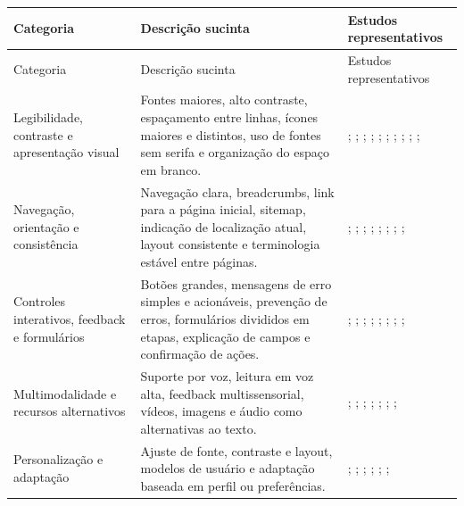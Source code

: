 \begin{longtable}{|p{3.2cm}|p{6cm}|p{5.8cm}|}
\hline
Categoria & Descrição sucinta & Estudos representativos \\ \hline
\endfirsthead
\hline
Categoria & Descrição sucinta & Estudos representativos \\ \hline
\endhead
\hline
\endfoot
\endlastfoot
Legibilidade, contraste e apresentação visual &
Fontes maiores, alto contraste, espaçamento entre linhas, ícones maiores e distintos, uso de fontes sem serifa e organização do espaço em branco. &
\cite{breaking_barriers}; \cite{ko2019old}; \cite{wang2020research}; \cite{darvishy2013inclusive}; \cite{hart2008evaluating}; \cite{sun2010preliminary}; \cite{kurniawan2005research}; \cite{lindberg2021towards}; \cite{lum2016development}; \cite{patsoule2012redesigning}; \cite{becker2004study} \\ \hline
Navegação, orientação e consistência &
Navegação clara, breadcrumbs, link para a página inicial, sitemap, indicação de localização atual, layout consistente e terminologia estável entre páginas. &
\cite{delara2016study}; \cite{finn2013usability}; \cite{dombrovskaia2021guideline}; \cite{patsoule2012redesigning}; \cite{sun2010preliminary}; \cite{kurniawan2005research}; \cite{lindberg2021towards}; \cite{zaphiris2003age}; \cite{chittaro2003guiding} \\ \hline
Controles interativos, feedback e formulários &
Botões grandes, mensagens de erro simples e acionáveis, prevenção de erros, formulários divididos em etapas, explicação de campos e confirmação de ações. &
\cite{breaking_barriers}; \cite{ro2024usability}; \cite{duarte2025designing}; \cite{filgueiras2009recoverability}; \cite{halbach2009framework}; \cite{trilar2021family}; \cite{taylor2009using}; \cite{lum2016development}; \cite{kurniawan2005research} \\ \hline
Multimodalidade e recursos alternativos &
Suporte por voz, leitura em voz alta, feedback multissensorial, vídeos, imagens e áudio como alternativas ao texto. &
\cite{duarte2025designing}; \cite{ueki2025ucker}; \cite{li2013content}; \cite{gautam2019adding}; \cite{gonzalez2025augmenting}; \cite{kusumaningayu2017web}; \cite{ramineni2024enhancing}; \cite{morash2015guiding} \\ \hline
Personalização e adaptação &
Ajuste de fonte, contraste e layout, modelos de usuário e adaptação baseada em perfil ou preferências. &
\cite{biswas2014interface}; \cite{park2015personalized}; \cite{kabassi2004personalised}; \cite{halbach2009framework}; \cite{wickramathilaka2023addressing}; \cite{lee2021factors}; \cite{oehme2014easing} \\ \hline

\end{longtable}
